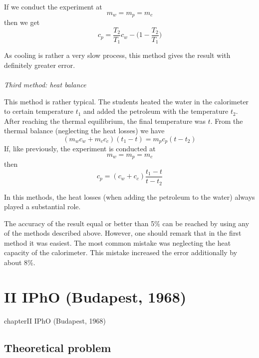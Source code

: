 \documentclass[12pt,a4paper]{book}
\begin{document}
	If we conduct the experiment at
	\begin{equation*}
		m_w=m_p=m_c
	\end{equation*}
	then we get
	\begin{equation}
		c_p=\frac{T_2}{T_1}c_w-\Big(1-\frac{T_2}{T_1}\Big)
	\end{equation}\par
	As cooling is rather a very slow process, this method gives the result with def\mbox{}initely greater error.\\ \\
	\noindent\emph{Third method: heat balance}\par
	This method is rather typical. The students heated the water in the calorimeter to certain temperature $t_1$ and added the petroleum with the temperature $t_2$. After reaching the thermal equilibrium, the f\mbox{}inal temperature was $t$. From the thermal balance (neglecting the heat losses) we have
	\begin{equation*}
		(m_wc_w+m_cc_c)(t_1-t)=m_pc_p(t-t_2)
	\end{equation*}
	If, like previously, the experiment is conducted at
	\begin{equation*}
		m_w=m_p=m_c
	\end{equation*}
	then
	\begin{equation}
		c_p=(c_w+c_c)\frac{t_1-t}{t-t_2}
	\end{equation}\par
	In this methods, the heat losses (when adding the petroleum to the water) always played a substantial role.\par
	The accuracy of the result equal or better than 5\% can be reached by using any of the methods described above. However, one should remark that in the f\mbox{}irst method it was easiest. The most common mistake was neglecting the heat capacity of the calorimeter. This mistake increased the error additionally by about 8\%.
\chapter*{II IPhO (Budapest, 1968)}
{chapter}{II IPhO (Budapest, 1968)}
\section*{Theoretical problem}
\end{document}
